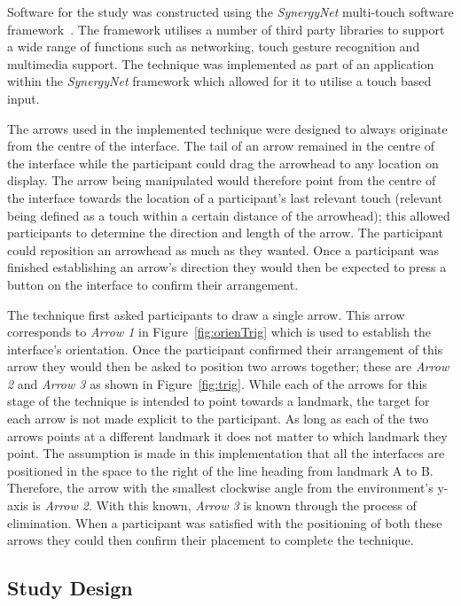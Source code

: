 \documentclass{bmcart}
\begin{document}
Software for the study was constructed using the {\emph{SynergyNet}} multi-touch software framework~\cite{AlAgha2010}.
The framework utilises a number of third party libraries to support a wide range of functions such as networking, touch gesture recognition and multimedia support.
The technique was implemented as part of an application within the {\emph{SynergyNet}} framework which allowed for it to utilise a touch based input.

The arrows used in the implemented technique were designed to always originate from the centre of the interface.
The tail of an arrow remained in the centre of the interface while the participant could drag the arrowhead to any location on display.
The arrow being manipulated would therefore point from the centre of the interface towards the location of a participant's last relevant touch (relevant being defined as a touch within a certain distance of the arrowhead); this allowed participants to determine the direction and length of the arrow.
The participant could reposition an arrowhead as much as they wanted.
Once a participant was finished establishing an arrow's direction they would then be expected to press a button on the interface to confirm their arrangement.

The technique first asked participants to draw a single arrow.
This arrow corresponds to {\emph{Arrow 1}} in Figure~\ref{fig:orienTrig} which is used to establish the interface's orientation.
Once the participant confirmed their arrangement of this arrow they would then be asked to position two arrows together; these are {\emph{Arrow 2}} and {\emph{Arrow 3}} as shown in Figure~\ref{fig:trig}.
While each of the arrows for this stage of the technique is intended to point towards a landmark, the target for each arrow is not made explicit to the participant.
As long as each of the two arrows points at a different landmark it does not matter to which landmark they point.
The assumption is made in this implementation that all the interfaces are positioned in the space to the right of the line heading from landmark A to B.
Therefore, the arrow with the smallest clockwise angle from the environment's y-axis is {\emph{Arrow 2}}.
With this known, {\emph{Arrow 3}} is known through the process of elimination.
When a participant was satisfied with the positioning of both these arrows they could then confirm their placement to complete the technique.

\subsection*{Study Design}\label{sec:design}
\end{document}
